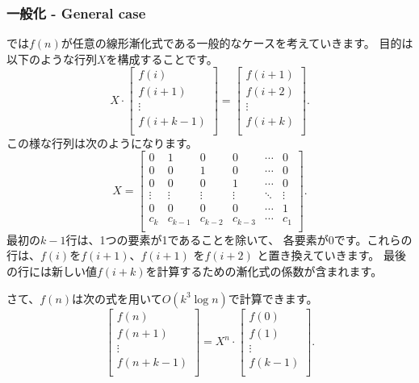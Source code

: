 \subsubsection{一般化 - General case}


では$f(n)$が任意の線形漸化式である一般的なケースを考えていきます。
目的は以下のような行列$X$を構成することです。
\[ X \cdot
 \begin{bmatrix}
  f(i) \\
  f(i+1) \\
  \vdots \\
  f(i+k-1) \\
 \end{bmatrix}
=
 \begin{bmatrix}
  f(i+1) \\
  f(i+2) \\
  \vdots \\
  f(i+k) \\
 \end{bmatrix}.
\]
この様な行列は次のようになります。
\[
X =
 \begin{bmatrix}
  0 & 1 & 0 & 0 & \cdots & 0 \\
  0 & 0 & 1 & 0 & \cdots & 0 \\
  0 & 0 & 0 & 1 & \cdots & 0 \\
  \vdots & \vdots & \vdots & \vdots & \ddots & \vdots \\
  0 & 0 & 0 & 0 & \cdots & 1 \\
  c_k & c_{k-1} & c_{k-2} & c_{k-3} & \cdots & c_1 \\
 \end{bmatrix}.
\]
最初の$k - 1$行は、1つの要素が1であることを除いて、
各要素が0です。これらの行は、$f (i)$を$f (i + 1)$、$f (i + 1)$ を$f (i + 2)$
と置き換えていきます。
最後の行には新しい値$f(i+k)$を計算するための漸化式の係数が含まれます。
\begin{samepage}
さて、$f (n)$は次の式を用いて$O(k^3 \log n)$で計算できます。
\[
 \begin{bmatrix}
  f(n) \\
  f(n+1) \\
  \vdots \\
  f(n+k-1) \\
 \end{bmatrix}
=
X^n \cdot
 \begin{bmatrix}
  f(0) \\
  f(1) \\
  \vdots \\
  f(k-1) \\
 \end{bmatrix}.
\]
\end{samepage}

